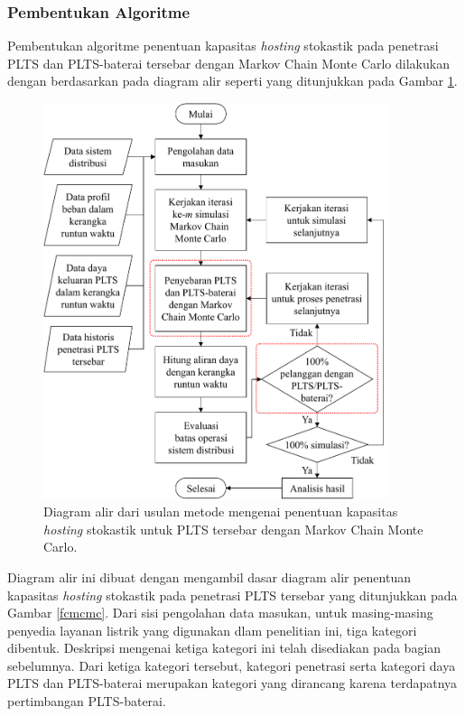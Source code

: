 {\subsubsection{Pembentukan Algoritme}
Pembentukan algoritme penentuan kapasitas \textit{\textit{hosting}} stokastik pada penetrasi PLTS dan PLTS-baterai tersebar dengan Markov Chain Monte Carlo dilakukan dengan berdasarkan pada diagram alir seperti yang ditunjukkan pada Gambar \ref{fcmcmcbatt}.
\begin{figure}[!t]
	\centering
	\includegraphics[width=0.9\textwidth]{Fig/fcmcmcbatt}
	\caption{Diagram alir dari usulan metode mengenai penentuan kapasitas \textit{\textit{hosting}} stokastik untuk PLTS tersebar dengan Markov Chain Monte Carlo.}
	\label{fcmcmcbatt}
\end{figure}
Diagram alir ini dibuat dengan mengambil dasar diagram alir penentuan kapasitas \textit{\textit{hosting}} stokastik pada penetrasi PLTS tersebar yang ditunjukkan pada Gambar \ref{fcmcmc}. Dari sisi pengolahan data masukan, untuk masing-masing penyedia layanan listrik yang digunakan dlam penelitian ini, tiga kategori dibentuk. Deskripsi mengenai ketiga kategori ini telah disediakan pada bagian sebelumnya. Dari ketiga kategori tersebut, kategori penetrasi serta kategori daya PLTS dan PLTS-baterai merupakan kategori yang dirancang karena terdapatnya pertimbangan PLTS-baterai.

}
